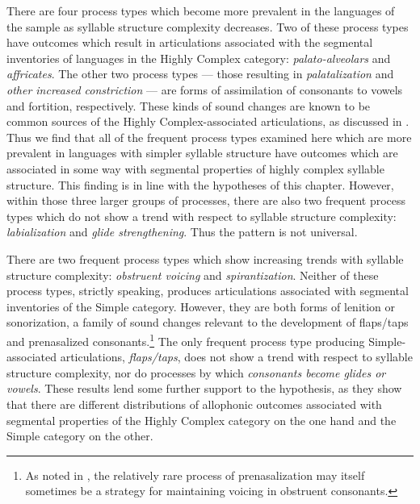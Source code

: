   There are four process types which become more prevalent in the languages of the sample as syllable structure complexity decreases. Two of these process types have outcomes which result in articulations associated with the segmental inventories of languages in the Highly Complex category: \textit{palato-alveolars} and \textit{affricates}. The other two process types — those resulting in \textit{palatalization} and \textit{other increased constriction} — are forms of assimilation of consonants to vowels and fortition, respectively. These kinds of sound changes are known to be common sources of the Highly Complex-associated articulations, as discussed in . Thus we find that all of the frequent process types examined here which are more prevalent in languages with simpler syllable structure have outcomes which are associated in some way with segmental properties of highly complex syllable structure. This finding is in line with the hypotheses of this chapter. However, within those three larger groups of processes, there are also two frequent process types which do not show a trend with respect to syllable structure complexity: \textit{labialization} and \textit{glide strengthening}. Thus the pattern is not universal.

  There are two frequent process types which show increasing trends with syllable structure complexity: \textit{obstruent voicing} and \textit{spirantization}. Neither of these process types, strictly speaking, produces articulations associated with segmental inventories of the Simple category. However, they are both forms of lenition or sonorization, a family of sound changes relevant to the development of flaps/taps and prenasalized consonants.\footnote{{As noted in , the relatively rare process of prenasalization may itself sometimes be a strategy for maintaining voicing in obstruent consonants.}} The only frequent process type producing Simple-associated articulations, \textit{flaps/taps}, does not show a trend with respect to syllable structure complexity, nor do processes by which \textit{consonants become glides or vowels}. These results lend some further support to the hypothesis, as they show that there are different distributions of allophonic outcomes associated with segmental properties of the Highly Complex category on the one hand and the Simple category on the other.

